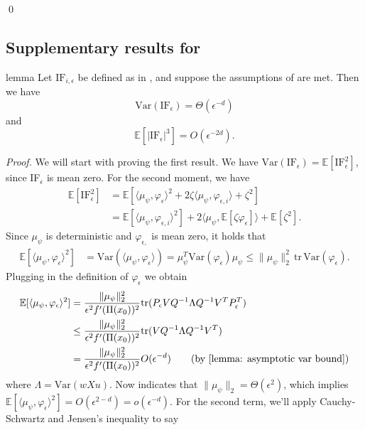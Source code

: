 \documentclass[11pt]{article}
\begin{document}
\qed{}

\subsection{Supplementary results for }

\begin{restatable}{lemma}{}
  Let $\text{IF}_{i, \epsilon}$ be defined as in , and suppose the assumptions of  are met. Then we have
  \[\text{Var}(\text{IF}_{\epsilon}) = \Theta(\epsilon^{-d})\]
  and 
  \[\mathbb{E}[|\text{IF}_{\epsilon}|^3] = O(\epsilon^{-2d}).\]
  \label{lemma: if bound}
\end{restatable}
\noindent \textit{Proof.} We will start with proving the first result. We have $\text{Var}(\text{IF}_{ \epsilon}) = \mathbb{E}[\text{IF}_{\epsilon}^2]$, since IF$_{ \epsilon}$ is mean zero. For the second moment, we have
\begin{align*}
    \mathbb{E}[\text{IF}_{\epsilon}^2] &= \mathbb{E}[\langle \mu_{\psi}, \varphi_{\epsilon}\rangle^2 + 2\zeta\langle \mu_{\psi}, \varphi_{\epsilon, i}\rangle + \zeta^2] \\
    &= \mathbb{E}[\langle \mu_{\psi}, \varphi_{\epsilon, i}\rangle^2] + 2\langle \mu_{\psi}, \mathbb{E}[\zeta \varphi_{ \epsilon}]\rangle + \mathbb{E}[\zeta^2]. 
\end{align*}
Since $\mu_\psi$ is deterministic and $\varphi_{\epsilon,}$ is mean zero, it holds that 
\begin{align*}
    \mathbb{E}[\langle \mu_{\psi}, \varphi_{\epsilon}\rangle^2] &= \text{Var}(\langle \mu_\psi, \varphi_{\epsilon}\rangle)  = \mu_\psi^T\text{Var}(\varphi_{\epsilon})\mu_\psi \leq \|\mu_\psi\|_2^2\,\text{tr}\,\text{Var}(\varphi_{\epsilon}).
\end{align*}
Plugging in the definition of $\varphi_{\epsilon}$ we obtain
\begin{align*}
\mathbb{E}[\langle \mu_{\psi}, \varphi_{\epsilon}\rangle^2] &= \frac{\|\mu_\psi\|_2^2}{\epsilon^2f'(\Pi(x_0))^2}\text{tr}(P_{\epsilon}VQ^{-1}\Lambda Q^{-1}V^TP_{\epsilon}^T) \\
&\leq \frac{\|\mu_\psi\|_2^2}{\epsilon^2f'(\Pi(x_0))^2}\text{tr}(VQ^{-1}\Lambda Q^{-1}V^T) \\
&= \frac{\|\mu_\psi\|_2^2}{\epsilon^2f'(\Pi(x_0))^2}O(\epsilon^{-d}) \tag{by \Cref{lemma: asymptotic var bound}}
\end{align*}
where $\Lambda = \text{Var}(wXu)$. Now  indicates that $\|\mu_\psi\|_2 = \Theta(\epsilon^2)$, which implies $\mathbb{E}[\langle \mu_{\psi}, \varphi_{\epsilon}\rangle^2] = O(\epsilon^{2-d}) = o(\epsilon^{-d})$. For the second term, we'll apply Cauchy-Schwartz and Jensen's inequality to say
\end{document}
